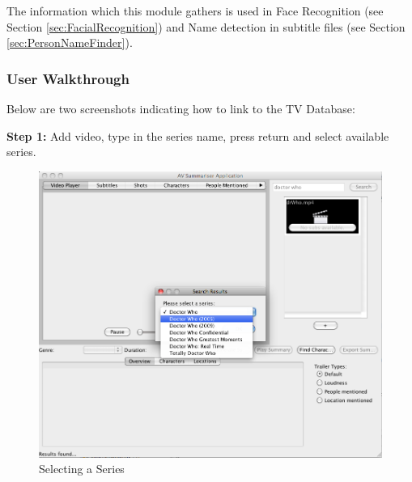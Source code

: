 The information which this module gathers is used in Face Recognition (see Section \ref{sec:FacialRecognition}) and Name detection in subtitle files (see Section \ref{sec:PersonNameFinder}).

\newpage 
\subsubsection{User Walkthrough}
Below are two screenshots indicating how to link to the TV Database:

\textbf{Step 1:} Add video, type in the series name, press return and select available series. 
\begin{figure}[ht]
\begin{center}
 \includegraphics[scale=0.31]{Images/TVDBWalkthrough1.png}
  \caption{Selecting a Series}
 \end{center}
\end{figure}


